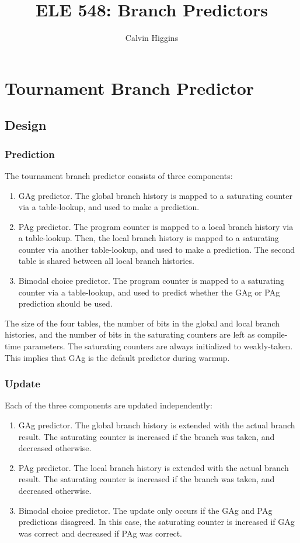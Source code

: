 \documentclass{article}
\title{ELE 548: Branch Predictors}
\author{Calvin Higgins}
\begin{document}
\maketitle

\section{Tournament Branch Predictor}

\subsection{Design}

\subsubsection{Prediction}

The tournament branch predictor consists of three components:
\begin{enumerate}
    \item GAg predictor. The global branch history is mapped to a saturating counter via a table-lookup, and used to make a prediction.
    \item PAg predictor. The program counter is mapped to a local branch history via a table-lookup. Then, the local branch history is mapped to a saturating 
    counter via another table-lookup, and used to make a prediction. The second table is shared between all local branch histories.
    \item Bimodal choice predictor. The program counter is mapped to a saturating counter via a table-lookup, and used to predict whether the GAg or PAg 
    prediction should be used.
\end{enumerate}

\noindent
The size of the four tables, the number of bits in the global and local branch histories, and the number of bits in the saturating counters are left as 
compile-time parameters. The saturating counters are always initialized to weakly-taken. This implies that GAg is the default predictor during warmup.

\subsubsection{Update}

Each of the three components are updated independently:
\begin{enumerate}
    \item GAg predictor. The global branch history is extended with the actual branch result. The saturating counter is increased if the branch was taken, and 
    decreased otherwise.
    \item PAg predictor. The local branch history is extended with the actual branch result. The saturating counter is increased if the branch was taken, and
    decreased otherwise.
    \item Bimodal choice predictor. The update only occurs if the GAg and PAg predictions disagreed. In this case, the saturating counter is increased if GAg 
    was correct and decreased if PAg was correct.
\end{enumerate}
\end{document}
